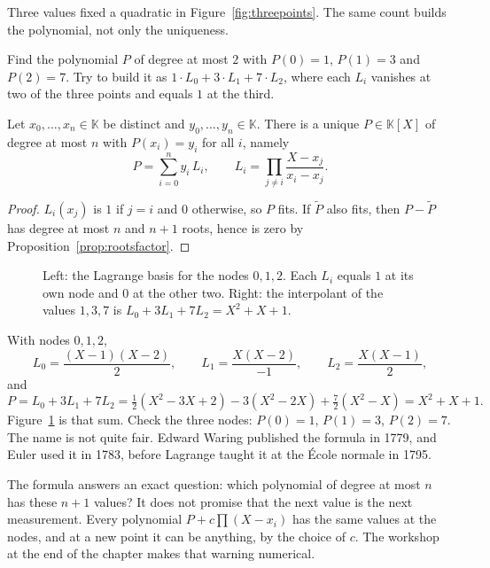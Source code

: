 Three values fixed a quadratic in Figure~\ref{fig:threepoints}. The same count builds the polynomial, not only the uniqueness.

\begin{think}
Find the polynomial $P$ of degree at most $2$ with $P(0)=1$, $P(1)=3$ and $P(2)=7$. Try to build it as $1\cdot L_0+3\cdot L_1+7\cdot L_2$, where each $L_i$ vanishes at two of the three points and equals $1$ at the third.
\end{think}

\begin{theorem}[Lagrange]\label{thm:lagrange}
Let $x_0,\dots,x_n\in\mathbb K$ be distinct and $y_0,\dots,y_n\in\mathbb K$. There is a unique $P\in\mathbb K[X]$ of degree at most $n$ with $P(x_i)=y_i$ for all $i$, namely
\[
P=\sum_{i=0}^ny_i\,L_i,\qquad L_i=\prod_{j\ne i}\frac{X-x_j}{x_i-x_j}.
\]
\end{theorem}
\begin{proof}
$L_i(x_j)$ is $1$ if $j=i$ and $0$ otherwise, so $P$ fits. If $\tilde P$ also fits, then $P-\tilde P$ has degree at most $n$ and $n+1$ roots, hence is zero by Proposition~\ref{prop:rootsfactor}.
\end{proof}

\begin{figure}[ht]
\centering
{}
\caption{Left: the Lagrange basis for the nodes $0,1,2$. Each $L_i$ equals $1$ at its own node and $0$ at the other two. Right: the interpolant of the values $1,3,7$ is $L_0+3L_1+7L_2=X^2+X+1$.}
\label{fig:lagrange}
\end{figure}

\begin{examplex}
With nodes $0,1,2$,
\[
L_0=\frac{(X-1)(X-2)}2,\qquad L_1=\frac{X(X-2)}{-1},\qquad L_2=\frac{X(X-1)}2,
\]
and
\[
P=L_0+3L_1+7L_2=\tfrac12(X^2-3X+2)-3(X^2-2X)+\tfrac72(X^2-X)=X^2+X+1.
\]
Figure~\ref{fig:lagrange} is that sum. Check the three nodes: $P(0)=1$, $P(1)=3$, $P(2)=7$. The name is not quite fair. Edward Waring published the formula in 1779, and Euler used it in 1783, before Lagrange taught it at the \'Ecole normale in 1795.
\end{examplex}

The formula answers an exact question: which polynomial of degree at most $n$ has these $n+1$ values? It does not promise that the next value is the next measurement. Every polynomial $P+c\prod(X-x_i)$ has the same values at the nodes, and at a new point it can be anything, by the choice of $c$. The workshop at the end of the chapter makes that warning numerical.

